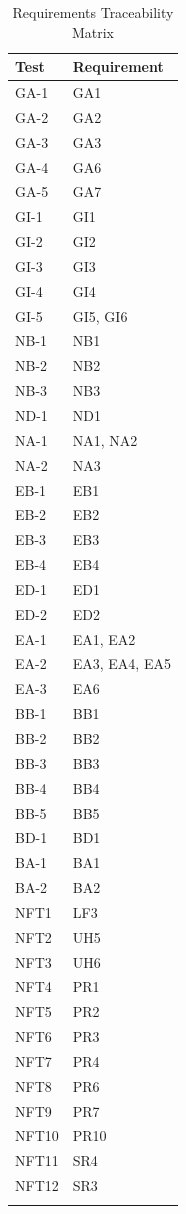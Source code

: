 \documentclass[12pt, titlepage]{article}
\begin{document}
\begin{longtable}{| p{} | p{} |}
  \hline
  Test & Requirement\\
  \hline
  GA-1 & GA1\\
  \hline
  GA-2 & GA2\\
  \hline
  GA-3 & GA3\\
  \hline
  GA-4 & GA6\\
  \hline
  GA-5 & GA7\\
  \hline
  GI-1 & GI1\\
  \hline
  GI-2 & GI2\\
  \hline
  GI-3 & GI3\\
  \hline
  GI-4 & GI4\\
  \hline
  GI-5 & GI5, GI6\\
  \hline
  NB-1 & NB1\\
  \hline
  NB-2 & NB2\\
  \hline
  NB-3 & NB3\\
  \hline
  ND-1 & ND1\\
  \hline
  NA-1 & NA1, NA2\\
  \hline
  NA-2 & NA3\\
  \hline
  EB-1 & EB1\\
  \hline
  EB-2 & EB2\\
  \hline
  EB-3 & EB3\\
  \hline
  EB-4 & EB4\\
  \hline
  ED-1 & ED1\\
  \hline
  ED-2 & ED2\\
  \hline
  EA-1 & EA1, EA2\\
  \hline
  EA-2 & EA3, EA4, EA5\\
  \hline
  EA-3 & EA6\\
  \hline
  BB-1 & BB1\\
  \hline
  BB-2 & BB2\\
  \hline
  BB-3 & BB3\\
  \hline
  BB-4 & BB4\\
  \hline
  BB-5 & BB5\\
  \hline
  BD-1 & BD1\\
  \hline
  BA-1 & BA1\\
  \hline
  BA-2 & BA2\\
  \hline
  NFT1 & LF3\\
  \hline
  NFT2 & UH5\\
  \hline
  NFT3 & UH6\\
  \hline
  NFT4 & PR1\\
  \hline
  NFT5 & PR2\\
  \hline
  NFT6 & PR3\\
  \hline
  NFT7 & PR4\\
  \hline
  NFT8 & PR6\\
  \hline
  NFT9 & PR7\\
  \hline
  NFT10 & PR10\\
  \hline
  NFT11 & SR4\\
  \hline
  NFT12 & SR3\\
  \hline
\caption{Requirements Traceability Matrix}
\end{longtable}
		
\end{document}
